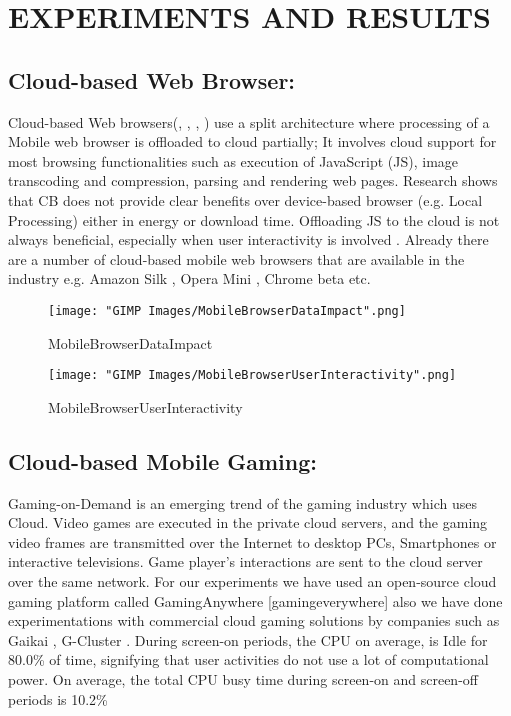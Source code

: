 \documentclass[12pt]{report}
\begin{document}
\section{EXPERIMENTS AND RESULTS}
\subsection{Cloud-based Web Browser:}
Cloud-based Web browsers(\cite{AmazonSilk}, \cite{ChromeBeta}, \cite{OperaMini}, \cite{wang2013accelerating}) use a split architecture where processing of a Mobile web browser is offloaded to cloud partially; It involves cloud support for most browsing functionalities such as execution of JavaScript (JS), image transcoding and compression, parsing and rendering web pages.
 Research shows that CB does not provide clear benefits over device-based browser (e.g. Local Processing) either in energy or download time. Offloading JS to the cloud is not always beneficial, especially when user interactivity is involved \cite{sivakumar2014cloud}.
Already there are a number of cloud-based mobile web browsers that are available in the industry e.g. Amazon Silk \cite{AmazonSilk}, Opera Mini \cite{OperaMini}, Chrome beta \cite{ChromeBeta} etc.
\begin{figure}[h]
  \centering
  \texttt{[image: "GIMP Images/MobileBrowserDataImpact".png]}
  \caption{MobileBrowserDataImpact}
  \label{fig:MobileBrowserDataImpact}
\end{figure}

\begin{figure}[h]
  \centering
  \texttt{[image: "GIMP Images/MobileBrowserUserInteractivity".png]}
  \caption{MobileBrowserUserInteractivity}
  \label{fig:MobileBrowserUserInteractivity}
\end{figure}

\subsection{Cloud-based Mobile Gaming:}
Gaming-on-Demand is an emerging trend of the gaming industry which uses Cloud. Video games are executed in the private cloud servers, and the gaming video frames are transmitted over the Internet to desktop PCs, Smartphones or interactive televisions. Game player’s interactions are sent to the cloud server over the same network. For our experiments we have used an open-source cloud gaming platform called GamingAnywhere [gamingeverywhere] also we have done experimentations with commercial cloud gaming solutions by companies such as Gaikai \cite{Gaikai}, G-Cluster \cite{gcluster}.
During screen-on periods, the CPU on average, is Idle for 80.0\%  of time, signifying that user activities do not use a lot of computational power. On average, the total CPU busy time during screen-on and screen-off periods is 10.2\%
\end{document}
